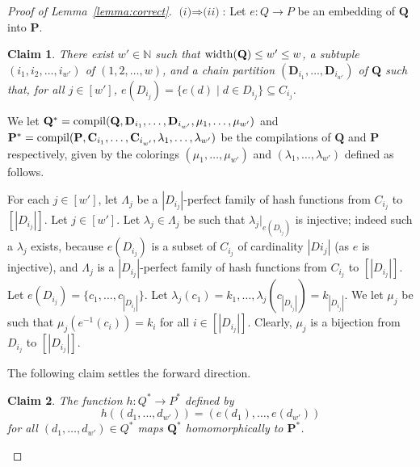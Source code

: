 \documentclass[usletter]{article}
\newcommand{\longversion}[1]{#1}
\newcommand{\shortversion}[1]{}
\newcommand{\longshort}[2]{\longversion{#1}\shortversion{#2}}
\newcommand{\cc}{\mathbf{C}}
\newcommand{\dd}{\mathbf{D}}
\newcommand{\pp}{\mathbf{P}}
\newcommand{\qq}{\mathbf{Q}}
\newtheorem{claim}{Claim}
\begin{document}
\begin{proof}[Proof of Lemma~\ref{lemma:correct}]
$\textit{(i)} \Rightarrow \textit{(ii)}$:  Let $e \colon Q\to P$ be an embedding of $\qq$ into $\pp$.  

\longshort{\begin{claim}}{\begin{claim}}
\label{claim:forwclaim1}
There exist $w' \in \mathbb{N}$ such that $\textup{width}(\qq) \leq w' \leq w$, 
a subtuple $(i_1,i_2,\ldots,i_{w'})$ of $(1,2,\ldots,w)$, 
and a chain partition $(\dd_{i_1},\ldots,\dd_{i_{w'}})$ of $\qq$ 
such that, for all $j \in [w']$, $e(D_{i_j})=\{ e(d) \mid d \in D_{i_j} \} \subseteq C_{i_j}$.  
\end{claim}

\longshort{\pfforwclaima}{\pfforwclaima}

We let $\qq^*=\textup{compil}(\qq,\dd_{i_1},\ldots,\dd_{i_{w'}},\mu_1,\ldots,\mu_{w'})$ 
and $\pp^*=\textup{compil}(\pp,\cc_{i_1},\ldots,\cc_{i_{w'}},\lambda_1,\ldots,\lambda_{w'})$ 
be the compilations of $\qq$ and $\pp$ respectively, given by the colorings 
$(\mu_1,\ldots,\mu_{w'})$ and $(\lambda_1,\ldots,\lambda_{w'})$ defined as follows.  

For each $j \in [w']$, let $\Lambda_j$ be a $|D_{i_j}|$-perfect family of hash functions from $C_{i_j}$ to $[|D_{i_j}|]$.  
Let $j \in [w']$.  Let $\lambda_j \in \Lambda_j$ be such that $\lambda_j|_{e(D_{i_j})}$ is injective; 
indeed such a $\lambda_j$ exists, because 
$e(D_{i_j})$ is a subset of $C_{i_j}$ of cardinality $|D{i_j}|$ (as $e$ is injective), 
and $\Lambda_j$ is a $|D_{i_j}|$-perfect family of hash functions from $C_{i_j}$ to $[|D_{i_j}|]$.  
Let $e(D_{i_j})=\{c_1,\ldots,c_{|D_{i_j}|}\}$.  Let $\lambda_j(c_1)=k_1,\ldots,\lambda_j(c_{|D_{i_j}|})=k_{|D_{i_j}|}$. 
We let $\mu_j$ be such that $\mu_j(e^{-1}(c_i))=k_i$ 
for all $i \in [|D_{i_j}|]$.  Clearly, $\mu_j$ is a bijection from $D_{i_j}$ to $[|D_{i_j}|]$.  

The following claim settles the forward direction.

\longshort{\begin{claim}}{\begin{claim}}
\label{claim:forwclaim}
The function $h \colon Q^* \to P^*$ defined 
by $$h((d_1,\ldots,d_{w'}))=(e(d_1),\ldots,e(d_{w'}))$$ 
for all $(d_1,\ldots,d_{w'}) \in Q^*$ maps $\mathbf{Q}^*$ homomorphically to $\mathbf{P}^*$.  
\end{claim}

\longshort{\pfforwclaim}{\pfforwclaim}


\end{proof}
\end{document}
